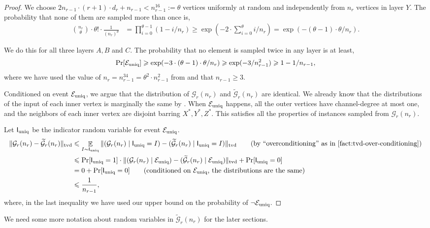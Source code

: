 \documentclass[11pt]{article}
\theoremstyle{definition}
\renewcommand{\leq}{\leqslant}
\renewcommand{\geq}{\geqslant}
\newcommand{\tvd}[2]{\ensuremath{\norm{#1 - #2}_{\mathrm{tvd}}}}
\newcommand{\paren}[1]{\ensuremath{\left(#1\right)}\xspace}
\newcommand{\norm}[1]{\ensuremath{\|#1\|}}
\DeclareMathOperator*{\Exp}{\ensuremath{{\mathbb{E}}}}
\DeclareMathOperator*{\Prob}{\ensuremath{\textnormal{Pr}}}
\renewcommand{\Pr}{\Prob}
\newcommand{\rv}[1]{\ensuremath{{\mathsf{#1}}}\xspace}
\newcommand{\Xstar}{\ensuremath{X^{*}}}
\newcommand{\Ystar}{\ensuremath{Y^{*}}}
\newcommand{\Zstar}{\ensuremath{Z^{*}}}
\newcommand{\cG}{\ensuremath{\mathcal{G}}}
\newcommand{\cGtil}{\ensuremath{\widetilde{\cG}}}
\newcommand{\Euniq}{\ensuremath{\mathcal{E}_{\textnormal{uniq}}}}
\newcommand{\rIuniq}{\ensuremath{\rv{I}_{\textnormal{uniq}}}}
\begin{document}
\begin{proof}
We choose $2n_{r-1} \cdot (r+1) \cdot d_r  + n_{r-1} < n_{r-1}^{16} := \theta$ vertices uniformly at random and independently from $n_r $ vertices in layer $Y$. The probability that none of them are sampled more than once is,
\begin{align*}
\binom{n_r}{\theta} \cdot \theta! \cdot \frac1{(n_r)^{\theta}} &= \prod_{i=0}^{\theta-1} (1-i/n_r) \geq \exp\paren{-2 \cdot \sum_{i=0}^{\theta} i/n_r} = \exp(-(\theta-1) \cdot \theta/n_r).
\end{align*}

We do this for all three layers $A, B$ and $C$. The probability that no element is sampled twice in any layer is at least, 
\begin{align*}
	\Pr[\Euniq] \geq	\exp(-3 \cdot (\theta-1) \cdot \theta/n_r) \geq \exp(-3/n_{r-1}^2) \geq 1-1/n_{r-1},
\end{align*}
where we have used the value of $n_r = n_{r-1}^{34} = \theta^2 \cdot n_{r-1}^2$ from  and that $n_{r-1} \geq 3$. 

Conditioned on event $\Euniq$, we argue that the distribution of $\cG_r(n_r)$ and $\cGtil_r(n_r)$ are identical. We already know that the distributions of the input of each inner vertex is marginally the same by . When $\Euniq$ happens, all the outer vertices have channel-degree at most one, and the neighbors of each inner vertex are disjoint barring $\Xstar, \Ystar, \Zstar$. This satisfies all the properties of instances sampled from $\cG_r(n_r)$. 

Let $\rIuniq$ be the indicator random variable for event $\Euniq$. 
\begin{align*}
	\tvd{\cG_r(n_r)}{\cGtil_r(n_r)} &\leq \Exp_{I \sim \rIuniq} \tvd{(\cG_r(n_r) \mid \rIuniq = I)}{(\cGtil_r(n_r) \mid \rIuniq = I)} \tag{by ``overconditioning'' as in \Cref{fact:tvd-over-conditioning}}\\
	&\leq \Pr[\rIuniq = 1] \cdot \tvd{(\cG_r(n_r) \mid \Euniq)}{(\cGtil_r(n_r) \mid \Euniq)} + \Pr[\rIuniq = 0] \\
	&=  0 + \Pr[\rIuniq = 0]  \tag{conditioned on $\Euniq$, the distributions are the same} \\
	&\leq \frac1{n_{r-1}},
\end{align*}
where, in the last inequality we have used our upper bound on the probability of $ \neg \Euniq$.
\end{proof}

We need some more notation about random variables in $\cGtil_r(n_r)$ for the later sections. 
\end{document}
